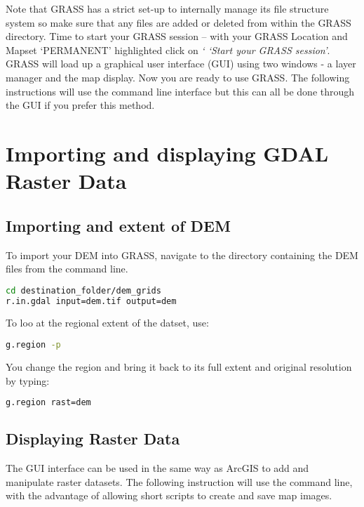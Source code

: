 Note that GRASS has a strict set-up to internally manage its file structure system so make sure that any files are added or deleted from within the GRASS directory. Time to start your GRASS session – with your GRASS Location and Mapset `PERMANENT’ highlighted click on \textit{‘
`Start your GRASS session'}. GRASS will load up a graphical user interface (GUI) using two windows - a layer manager and the map display. Now you are ready to use GRASS. The following instructions will use the command line interface but this can all be done through the GUI if you prefer this method. 

\section{Importing and displaying GDAL Raster Data}

\subsection*{Importing and extent of DEM}

To import your DEM into GRASS, navigate to the directory containing the DEM files from the command line. 

\begin{lstlisting}[language=bash]
cd destination_folder/dem_grids
r.in.gdal input=dem.tif output=dem
\end{lstlisting}

To loo at the regional extent of the datset, use:

\begin{lstlisting}[language=bash]
g.region -p
\end{lstlisting}

You change the region and bring it back to its full extent and original resolution by typing:

\begin{lstlisting}[language=bash]
g.region rast=dem
\end{lstlisting}

\subsection*{Displaying Raster Data}

The GUI interface can be used in the same way as ArcGIS to add and manipulate raster datasets. The following instruction will use the command line, with the advantage of allowing short scripts to create and save map images.

